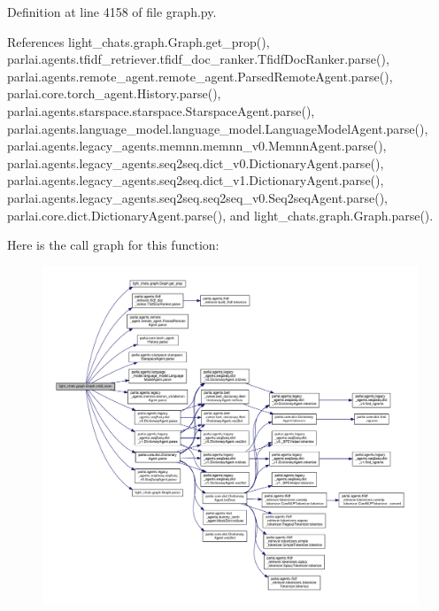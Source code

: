 Definition at line 4158 of file graph.\+py.



References light\+\_\+chats.\+graph.\+Graph.\+get\+\_\+prop(), parlai.\+agents.\+tfidf\+\_\+retriever.\+tfidf\+\_\+doc\+\_\+ranker.\+Tfidf\+Doc\+Ranker.\+parse(), parlai.\+agents.\+remote\+\_\+agent.\+remote\+\_\+agent.\+Parsed\+Remote\+Agent.\+parse(), parlai.\+core.\+torch\+\_\+agent.\+History.\+parse(), parlai.\+agents.\+starspace.\+starspace.\+Starspace\+Agent.\+parse(), parlai.\+agents.\+language\+\_\+model.\+language\+\_\+model.\+Language\+Model\+Agent.\+parse(), parlai.\+agents.\+legacy\+\_\+agents.\+memnn.\+memnn\+\_\+v0.\+Memnn\+Agent.\+parse(), parlai.\+agents.\+legacy\+\_\+agents.\+seq2seq.\+dict\+\_\+v0.\+Dictionary\+Agent.\+parse(), parlai.\+agents.\+legacy\+\_\+agents.\+seq2seq.\+dict\+\_\+v1.\+Dictionary\+Agent.\+parse(), parlai.\+agents.\+legacy\+\_\+agents.\+seq2seq.\+seq2seq\+\_\+v0.\+Seq2seq\+Agent.\+parse(), parlai.\+core.\+dict.\+Dictionary\+Agent.\+parse(), and light\+\_\+chats.\+graph.\+Graph.\+parse().

Here is the call graph for this function\+:
\nopagebreak
\begin{figure}[H]
\begin{center}
\leavevmode
\includegraphics[width=350pt]{classlight__chats_1_1graph_1_1Graph_accd7dfd84e4f2bee3fc3fbac8d8577cd_cgraph}
\end{center}
\end{figure}
\mbox{\label{classlight__chats_1_1graph_1_1Graph_a7094a23385f250b9ea06d07c515ad14c}} 
